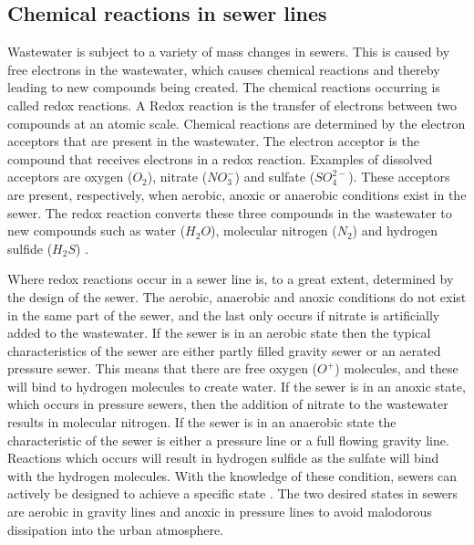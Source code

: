 \subsection{Chemical reactions in sewer lines}\label{subse:chemical_reactions_in_a_sewer}
Wastewater is subject to a variety of mass changes in sewers. This is caused by free electrons in the wastewater, which causes chemical reactions and thereby leading to new compounds being created. %
The chemical reactions occurring is called redox reactions. %
A Redox reaction is the transfer of electrons between two compounds at an atomic scale.
Chemical reactions are determined by the electron acceptors that are present in the wastewater. 
The electron acceptor is the compound that receives electrons in a redox reaction.
Examples of dissolved acceptors are oxygen ($O_2$), nitrate ($NO^-_3$) and sulfate ($SO^{2-}_4$). These acceptors are present, respectively, when aerobic, anoxic or anaerobic conditions exist in the sewer. 
The redox reaction converts these three compounds in the wastewater to new compounds such as water ($H_2O$), molecular nitrogen ($N_2$) and hydrogen sulfide ($H_2S$) \cite{Sewer_processes}. 

Where redox reactions occur in a sewer line is, to a great extent, determined by the design of the sewer. The aerobic, anaerobic and anoxic conditions do not exist in the same part of the sewer, and the last only occurs if nitrate is artificially added to the wastewater. If the sewer is in an aerobic state then the typical characteristics of the sewer are either partly filled gravity sewer or an aerated pressure sewer. This means that there are free oxygen ($O^+$) molecules, and these will bind to hydrogen molecules to create water. If the sewer is in an anoxic state, which occurs in pressure sewers, then the addition of nitrate to the wastewater results in molecular nitrogen. If the sewer is in an anaerobic state the characteristic of the sewer is either a pressure line or a full flowing gravity line. Reactions which occurs will result in hydrogen sulfide as the sulfate will bind with the hydrogen molecules. With the knowledge of these condition, sewers can actively be designed to achieve a specific state \cite{Sewer_processes}. The two desired states in sewers are aerobic in gravity lines and anoxic in pressure lines to avoid malodorous dissipation into the urban atmosphere.

